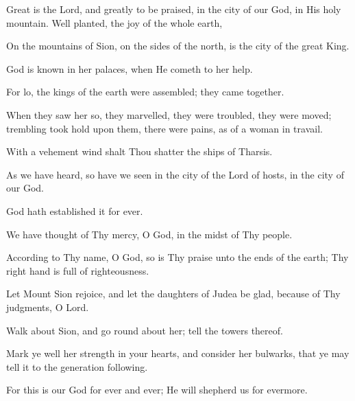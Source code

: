 Great is the Lord, and greatly to be praised, in the city of our God, in His holy mountain. Well planted, the joy of the whole earth,

On the mountains of Sion, on the sides of the north, is the city of the great King.

God is known in her palaces, when He cometh to her help.

For lo, the kings of the earth were assembled; they came together.

When they saw her so, they marvelled, they were troubled, they were moved; trembling took hold upon them, there were pains, as of a woman in travail.

With a vehement wind shalt Thou shatter the ships of Tharsis.

As we have heard, so have we seen in the city of the Lord of hosts, in the city of our God.

God hath established it for ever.

We have thought of Thy mercy, O God, in the midst of Thy people.

According to Thy name, O God, so is Thy praise unto the ends of the earth; Thy right hand is full of righteousness.

Let Mount Sion rejoice, and let the daughters of Judea be glad, because of Thy judgments, O Lord.

Walk about Sion, and go round about her; tell the towers thereof.

Mark ye well her strength in your hearts, and consider her bulwarks, that ye may tell it to the generation following.

For this is our God for ever and ever; He will shepherd us for evermore.
